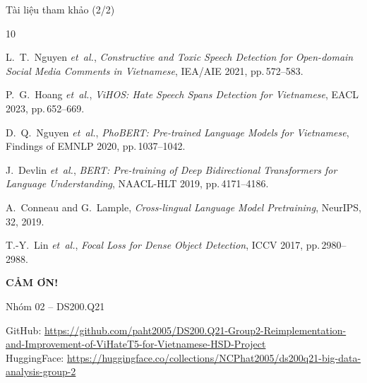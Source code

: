 \documentclass[11pt, aspectratio=169]{beamer}
\begin{document}
\begin{frame}[shrink=5]{Tài liệu tham khảo (2/2)}
\scriptsize
\begin{thebibliography}{10}

L.~T.~Nguyen \emph{et~al.},
\textit{Constructive and Toxic Speech Detection for Open-domain Social Media Comments in Vietnamese},
IEA/AIE 2021, pp.\,572--583.

P.~G.~Hoang \emph{et~al.},
\textit{ViHOS: Hate Speech Spans Detection for Vietnamese},
EACL 2023, pp.\,652--669.

D.~Q.~Nguyen \emph{et~al.},
\textit{PhoBERT: Pre-trained Language Models for Vietnamese},
Findings of EMNLP 2020, pp.\,1037--1042.

J.~Devlin \emph{et~al.},
\textit{BERT: Pre-training of Deep Bidirectional Transformers for Language Understanding},
NAACL-HLT 2019, pp.\,4171--4186.

A.~Conneau and G.~Lample,
\textit{Cross-lingual Language Model Pretraining},
NeurIPS, 32, 2019.

T.-Y.~Lin \emph{et~al.},
\textit{Focal Loss for Dense Object Detection},
ICCV 2017, pp.\,2980--2988.

\end{thebibliography}
\end{frame}



\begin{frame}[plain]
  \begin{center}
    \Huge\textbf{CẢM ƠN!}

    \vspace{1cm}
    \large Nhóm 02 -- DS200.Q21

    \vspace{0.5cm}
    \normalsize
    GitHub: \url{https://github.com/paht2005/DS200.Q21-Group2-Reimplementation-and-Improvement-of-ViHateT5-for-Vietnamese-HSD-Project}\\
    HuggingFace: \url{https://huggingface.co/collections/NCPhat2005/ds200q21-big-data-analysis-group-2}
  \end{center}
\end{frame}
\end{document}
